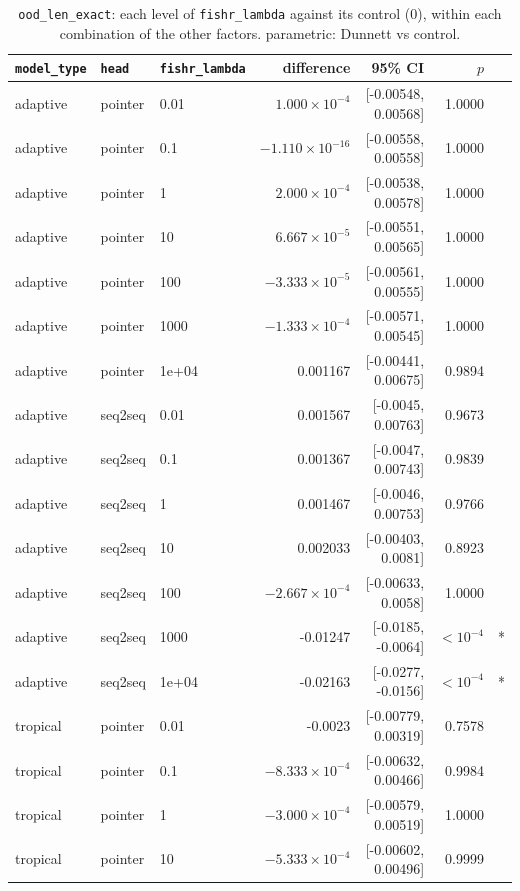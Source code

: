 \documentclass[10pt]{article}
\begin{document}
{\small
\begin{longtable}{lllrrrl}
\caption{\texttt{ood\_len\_exact}: each level of \texttt{fishr\_lambda} against its control (0), within each combination of the other factors. parametric: Dunnett vs control.}\label{tab:control-ood_len_exact}\\
\toprule
\texttt{model\_type} & \texttt{head} & \texttt{fishr\_lambda} & difference & 95\% CI & $p$ & \\
\midrule
\endhead
adaptive & pointer & 0.01 & $1.000\times10^{-4}$ & [-0.00548, 0.00568] & 1.0000 & \\
adaptive & pointer & 0.1 & $-1.110\times10^{-16}$ & [-0.00558, 0.00558] & 1.0000 & \\
adaptive & pointer & 1 & $2.000\times10^{-4}$ & [-0.00538, 0.00578] & 1.0000 & \\
adaptive & pointer & 10 & $6.667\times10^{-5}$ & [-0.00551, 0.00565] & 1.0000 & \\
adaptive & pointer & 100 & $-3.333\times10^{-5}$ & [-0.00561, 0.00555] & 1.0000 & \\
adaptive & pointer & 1000 & $-1.333\times10^{-4}$ & [-0.00571, 0.00545] & 1.0000 & \\
adaptive & pointer & 1e+04 & 0.001167 & [-0.00441, 0.00675] & 0.9894 & \\
adaptive & seq2seq & 0.01 & 0.001567 & [-0.0045, 0.00763] & 0.9673 & \\
adaptive & seq2seq & 0.1 & 0.001367 & [-0.0047, 0.00743] & 0.9839 & \\
adaptive & seq2seq & 1 & 0.001467 & [-0.0046, 0.00753] & 0.9766 & \\
adaptive & seq2seq & 10 & 0.002033 & [-0.00403, 0.0081] & 0.8923 & \\
adaptive & seq2seq & 100 & $-2.667\times10^{-4}$ & [-0.00633, 0.0058] & 1.0000 & \\
adaptive & seq2seq & 1000 & -0.01247 & [-0.0185, -0.0064] & $<10^{-4}$ & *\\
adaptive & seq2seq & 1e+04 & -0.02163 & [-0.0277, -0.0156] & $<10^{-4}$ & *\\
tropical & pointer & 0.01 & -0.0023 & [-0.00779, 0.00319] & 0.7578 & \\
tropical & pointer & 0.1 & $-8.333\times10^{-4}$ & [-0.00632, 0.00466] & 0.9984 & \\
tropical & pointer & 1 & $-3.000\times10^{-4}$ & [-0.00579, 0.00519] & 1.0000 & \\
tropical & pointer & 10 & $-5.333\times10^{-4}$ & [-0.00602, 0.00496] & 0.9999 & \\

\end{longtable}}
\end{document}
